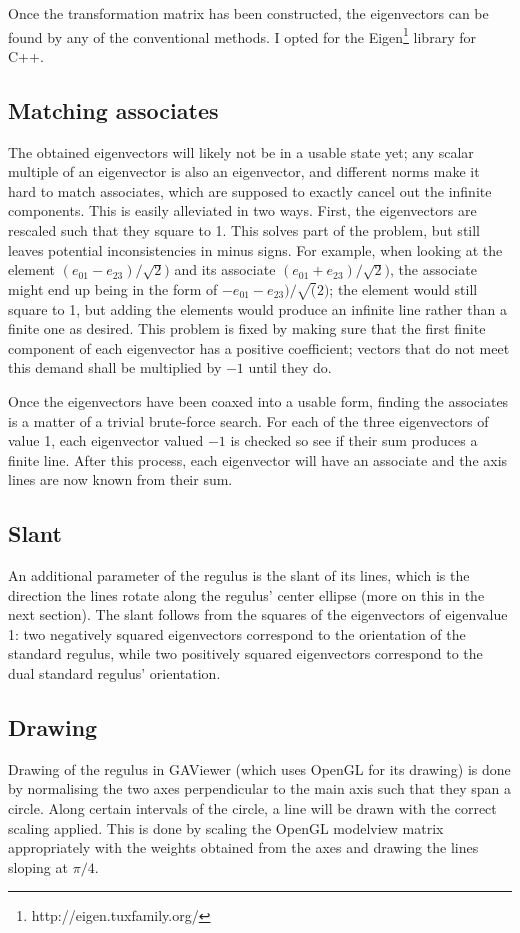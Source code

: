 \documentclass[a4paper, 10pt]{article}
\begin{document}
Once the transformation matrix has been constructed, the eigenvectors can be
found by any of the conventional methods. I opted for the
Eigen\footnote{http://eigen.tuxfamily.org/} library for C++.

\subsection{Matching associates}
The obtained eigenvectors will likely not be in a usable state yet; any scalar
multiple of an eigenvector is also an eigenvector, and different norms make it
hard to match associates, which are supposed to exactly cancel out the infinite
components. This is easily alleviated in two ways. First, the eigenvectors are
rescaled such that they square to 1. This solves part of the problem, but still
leaves potential inconsistencies in minus signs. For example, when looking at
the element $(e_{01} - e_{23}) / \sqrt{2})$ and its associate $(e_{01} + e_{23})
/ \sqrt{2})$, the associate might end up being in the form of $-e_{01} - e_{23})
/ \sqrt(2)$; the element would still square to 1, but adding the elements would
produce an infinite line rather than a finite one as desired.
This problem is fixed by making sure that the first finite component of each
eigenvector has a positive coefficient; vectors that do not meet this demand
shall be multiplied by $-1$ until they do.

Once the eigenvectors have been coaxed into a usable form, finding the
associates is a matter of a trivial brute-force search. For each of the three
eigenvectors of value 1, each eigenvector valued $-1$ is checked so see if their
sum produces a finite line. After this process, each eigenvector will have an
associate and the axis lines are now known from their sum.

\subsection{Slant}
An additional parameter of the regulus is the slant of its lines, which is the
direction the lines rotate along the regulus' center ellipse (more on this in
the next section). The slant follows from the squares of the eigenvectors of
eigenvalue 1: two negatively squared eigenvectors correspond to the orientation
of the standard regulus, while two positively squared eigenvectors correspond to
the dual standard regulus' orientation.

\subsection{Drawing}
Drawing of the regulus in GAViewer (which uses OpenGL for its drawing) is done
by normalising the two axes perpendicular to the main axis such that they span a
circle. Along certain intervals of the circle, a line will be drawn with the
correct scaling applied.  This is done by scaling the OpenGL modelview matrix
appropriately with the weights obtained from the axes and drawing the lines
sloping at $\pi / 4$.
\end{document}
